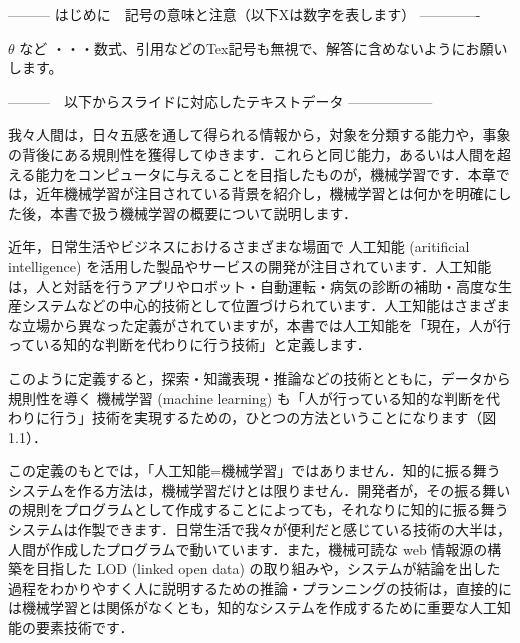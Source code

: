 --------- はじめに　記号の意味と注意（以下Xは数字を表します） -------------

$\theta$ など       ・・・数式、引用などのTex記号も無視で、解答に含めないようにお願いします。
\cite{mitchell97}

---------　以下からスライドに対応したテキストデータ ------------------


我々人間は，日々五感を通して得られる情報から，対象を分類する能力や，事象の背後にある規則性を獲得してゆきます．これらと同じ能力，あるいは人間を超える能力をコンピュータに与えることを目指したものが，機械学習です．本章では，近年機械学習が注目されている背景を紹介し，機械学習とは何かを明確にした後，本書で扱う機械学習の概要について説明します．


近年，日常生活やビジネスにおけるさまざまな場面で
人工知能 (aritificial intelligence)
を活用した製品やサービスの開発が注目されています．人工知能は，人と対話を行うアプリやロボット・自動運転・病気の診断の補助・高度な生産システムなどの中心的技術として位置づけられています．人工知能はさまざまな立場から異なった定義がされていますが，本書では人工知能を「現在，人が行っている知的な判断を代わりに行う技術」と定義します．

このように定義すると，探索・知識表現・推論などの技術とともに，データから規則性を導く
機械学習 (machine learning)
も「人が行っている知的な判断を代わりに行う」技術を実現するための，ひとつの方法ということになります（図1.1）．

この定義のもとでは，「人工知能=機械学習」ではありません．知的に振る舞うシステムを作る方法は，機械学習だけとは限りません．開発者が，その振る舞いの規則をプログラムとして作成することによっても，それなりに知的に振る舞うシステムは作製できます．日常生活で我々が便利だと感じている技術の大半は，人間が作成したプログラムで動いています．また，機械可読な web 情報源の構築を目指した LOD (linked open data) の取り組みや，システムが結論を出した過程をわかりやすく人に説明するための推論・プランニングの技術は，直接的には機械学習とは関係がなくとも，知的なシステムを作成するために重要な人工知能の要素技術です．

